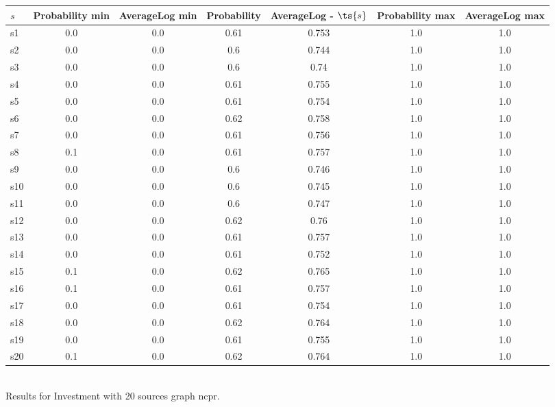 \documentclass{article}
\begin{document}
\noindent\begin{tabular}{|l|c|c|c|c|c|c|}
\hline
$s$& Probability min & AverageLog min & Probability & AverageLog - $\ts{s}$ & Probability max & AverageLog max\\
\hline
s1 &0.0 & 0.0 & 0.61 & 0.753 & 1.0 & 1.0\\
\hline
s2 &0.0 & 0.0 & 0.6 & 0.744 & 1.0 & 1.0\\
\hline
s3 &0.0 & 0.0 & 0.6 & 0.74 & 1.0 & 1.0\\
\hline
s4 &0.0 & 0.0 & 0.61 & 0.755 & 1.0 & 1.0\\
\hline
s5 &0.0 & 0.0 & 0.61 & 0.754 & 1.0 & 1.0\\
\hline
s6 &0.0 & 0.0 & 0.62 & 0.758 & 1.0 & 1.0\\
\hline
s7 &0.0 & 0.0 & 0.61 & 0.756 & 1.0 & 1.0\\
\hline
s8 &0.1 & 0.0 & 0.61 & 0.757 & 1.0 & 1.0\\
\hline
s9 &0.0 & 0.0 & 0.6 & 0.746 & 1.0 & 1.0\\
\hline
s10 &0.0 & 0.0 & 0.6 & 0.745 & 1.0 & 1.0\\
\hline
s11 &0.0 & 0.0 & 0.6 & 0.747 & 1.0 & 1.0\\
\hline
s12 &0.0 & 0.0 & 0.62 & 0.76 & 1.0 & 1.0\\
\hline
s13 &0.0 & 0.0 & 0.61 & 0.757 & 1.0 & 1.0\\
\hline
s14 &0.0 & 0.0 & 0.61 & 0.752 & 1.0 & 1.0\\
\hline
s15 &0.1 & 0.0 & 0.62 & 0.765 & 1.0 & 1.0\\
\hline
s16 &0.1 & 0.0 & 0.61 & 0.757 & 1.0 & 1.0\\
\hline
s17 &0.0 & 0.0 & 0.61 & 0.754 & 1.0 & 1.0\\
\hline
s18 &0.0 & 0.0 & 0.62 & 0.764 & 1.0 & 1.0\\
\hline
s19 &0.0 & 0.0 & 0.61 & 0.755 & 1.0 & 1.0\\
\hline
s20 &0.1 & 0.0 & 0.62 & 0.764 & 1.0 & 1.0\\
\hline
\end{tabular}\\

\noindent Results for Investment with 20 sources graph ncpr.
\end{document}
